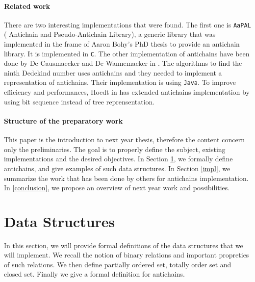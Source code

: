 \documentclass[letterpaper]{article}
\theoremstyle{definition}
\begin{document}
\paragraph{Related work}

There are two interesting implementations that were found.
The first one is \texttt{AaPAL} (
Antichain and Pseudo-Antichain Library), a generic
library that was implemented in the frame of
Aaron Bohy's PhD thesis \cite{bohy_phd}
to provide an antichain library. It is implemented in \texttt{C}.
The other implementation of antichains
have been done
by De Causmaecker and De Wannemacker in \cite{causemaecker1}. The algorithms
to find the ninth Dedekind number uses antichains and they needed to
implement a representation of antichains. Their implementation is using
\texttt{Java}.
To improve efficiency and performances, Hoedt in \cite{hoedt} has extended
\cite{causemaecker1} antichains implementation by using bit sequence
instead of tree reprensentation.

\paragraph{Structure of the preparatory work}

This paper is the introduction to next year thesis, therefore
the content concern only the preliminaries. The goal is to
properly define the subject,
existing implementations and the desired objectives.
In Section \ref{data_structures}, we formally define antichains,
and give examples of such data structures. In Section \ref{impl},
we summarize the work that has been done by others
for antichains implementation. In \ref{conclusion}, we propose
an overview of next year work and possibilities.

\newpage

\section{Data Structures}

\label{data_structures}

\paragraph{}

In this section, we will provide formal definitions of the data
structures that we will implement. We recall the notion of binary relations
and important propreties of such relations.
We then define partially ordered set, totally order set and closed set.
Finally we give a formal definition for antichains.
\end{document}
